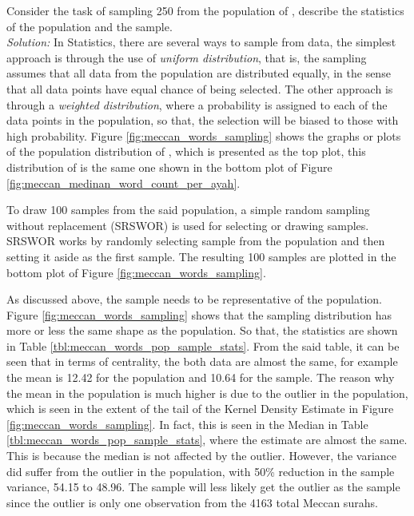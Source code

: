 \begin{exmp}\label{ex:population_sample_distribution_meccan_words}
Consider the task of sampling 250   from the population of , describe the statistics of the population and the sample.\\
\textit{Solution:} In Statistics, there are several ways to sample from data, the simplest approach is through the use of \textit{uniform distribution}, that is, the sampling assumes that all data from the population are distributed equally, in the sense that all data points have equal chance of being selected. The other approach is through a \textit{weighted distribution}, where a probability is assigned to each of the data points in the population, so that, the selection will be biased to those with high probability. Figure \ref{fig:meccan_words_sampling} shows the graphs or plots of the population distribution of  , which is presented as the top plot, this distribution of  is the same one shown in the bottom plot of Figure \ref{fig:meccan_medinan_word_count_per_ayah}. 

To draw 100 samples from the said population, a simple random sampling without replacement (SRSWOR) is used for selecting or drawing samples. SRSWOR works by randomly selecting sample from the population and then setting it aside as the first sample. The resulting 100 samples are plotted in the bottom plot of Figure \ref{fig:meccan_words_sampling}.

As discussed above, the sample needs to be representative of the population. Figure \ref{fig:meccan_words_sampling} shows that the sampling distribution has more or less the same shape as the population. So that, the statistics are shown in Table \ref{tbl:meccan_words_pop_sample_stats}. From the said table, it can be seen that in terms of centrality, the both data are almost the same, for example the mean is 12.42 for the population and 10.64 for the sample. The reason why the mean in the population is much higher is due to the outlier in the population, which is seen in the extent of the tail of the Kernel Density Estimate in Figure \ref{fig:meccan_words_sampling}. In fact, this is seen in the Median in Table \ref{tbl:meccan_words_pop_sample_stats}, where  the estimate are almost the same. This is because the median is not affected by the outlier. However, the variance did suffer from the outlier in the population, with 50\% reduction in the sample variance, 54.15 to 48.96. The sample will less likely get the outlier as the sample since the outlier is only one observation from the 4163 total Meccan surahs.


\end{exmp}
